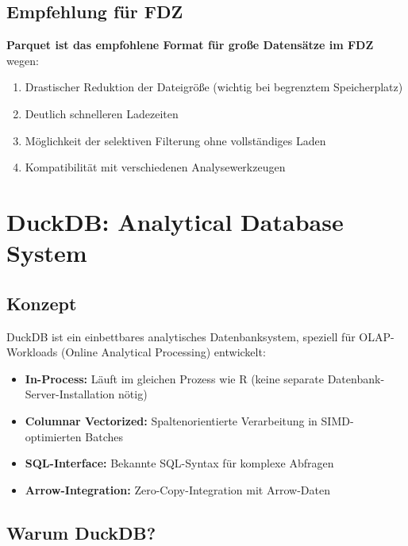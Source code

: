 \documentclass[
  ngerman,
  10pt,
  letterpaper,
  twocolumn]{book}
\providecommand{\tightlist}{%
  \setlength{\itemsep}{0pt}\setlength{\parskip}{0pt}}
\begin{document}
\subsection{Empfehlung für FDZ}\label{empfehlung-fuxfcr-fdz}

\textbf{Parquet ist das empfohlene Format für große Datensätze im FDZ}
wegen:

\begin{enumerate}
\def\labelenumi{\arabic{enumi}.}
\tightlist
\item
  Drastischer Reduktion der Dateigröße (wichtig bei begrenztem
  Speicherplatz)
\item
  Deutlich schnelleren Ladezeiten
\item
  Möglichkeit der selektiven Filterung ohne vollständiges Laden
\item
  Kompatibilität mit verschiedenen Analysewerkzeugen
\end{enumerate}

\section{DuckDB: Analytical Database
System}\label{duckdb-analytical-database-system}

\subsection{Konzept}\label{konzept}

DuckDB ist ein einbettbares analytisches Datenbanksystem, speziell für
OLAP-Workloads (Online Analytical Processing) entwickelt:

\begin{itemize}
\tightlist
\item
  \textbf{In-Process:} Läuft im gleichen Prozess wie R (keine separate
  Datenbank-Server-Installation nötig)
\item
  \textbf{Columnar Vectorized:} Spaltenorientierte Verarbeitung in
  SIMD-optimierten Batches
\item
  \textbf{SQL-Interface:} Bekannte SQL-Syntax für komplexe Abfragen
\item
  \textbf{Arrow-Integration:} Zero-Copy-Integration mit Arrow-Daten
\end{itemize}

\subsection{Warum DuckDB?}\label{warum-duckdb}
\end{document}
